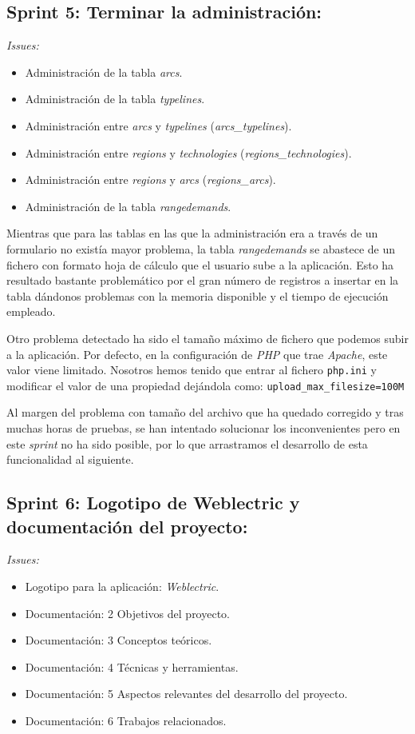 \subsection{Sprint 5: Terminar la administración:}
\textit{Issues:}
\begin{itemize}
	\item Administración de la tabla \textit{arcs}.
	\item Administración de la tabla \textit{typelines}.
	\item Administración entre \textit{arcs} y \textit{typelines} (\textit{arcs\_typelines}).
	\item Administración entre \textit{regions} y \textit{technologies} (\textit{regions\_technologies}).
	\item Administración entre \textit{regions} y \textit{arcs} (\textit{regions\_arcs}).
	\item Administración de la tabla \textit{rangedemands}.
\end{itemize}

Mientras que para las tablas en las que la administración era a través de un formulario no existía mayor problema, la tabla \textit{rangedemands} se abastece de un fichero con formato hoja de cálculo que el usuario sube a la aplicación. Esto ha resultado bastante problemático por el gran número de registros a insertar en la tabla dándonos problemas con la memoria disponible y el tiempo de ejecución empleado.

Otro problema detectado ha sido el tamaño máximo de fichero que podemos subir a la aplicación. Por defecto, en la configuración de \textit{PHP} que trae \textit{Apache}, este valor viene limitado. Nosotros hemos tenido que entrar al fichero \verb|php.ini| y modificar el valor de una propiedad dejándola como: \verb|upload_max_filesize=100M|

Al margen del problema con tamaño del archivo que ha quedado corregido y tras muchas horas de pruebas, se han intentado solucionar los inconvenientes pero en este \textit{sprint} no ha sido posible, por lo que arrastramos el desarrollo de esta funcionalidad al siguiente.


\subsection{Sprint 6: Logotipo de Weblectric y documentación del proyecto:}
\textit{Issues:}
\begin{itemize}
	\item Logotipo para la aplicación: \textit{Weblectric}.
	\item Documentación: 2 Objetivos del proyecto.
	\item Documentación: 3 Conceptos teóricos.
	\item Documentación: 4 Técnicas y herramientas.
	\item Documentación: 5 Aspectos relevantes del desarrollo del proyecto.
	\item Documentación: 6 Trabajos relacionados.
\end{itemize}

